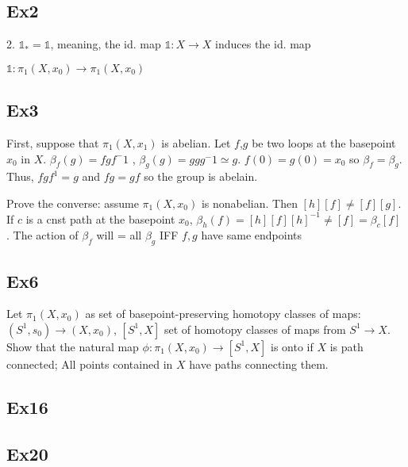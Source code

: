 \documentclass[11pt]{article}
\begin{document}
\subsection*{Ex2}

2. $\mathds{1}_* = \mathds{1}$, meaning, the id. map $\mathds{1} : X \rightarrow X$ induces the id. map

$\mathds{1} : \pi_1(X,x_0) \rightarrow \pi_1(X,x_0)$







\subsection*{Ex3}

First, suppose that $\pi_1(X,x_1)$ is abelian. Let $f$,$g$ be two loops at the basepoint $x_0$ in $X$. 
$\beta_f(g) = fgf^-1$ , $\beta_g(g) = ggg^-1 \simeq g$. $f(0) = g(0) = x_0$ so $\beta_f = \beta_g$. Thus, $fgf^1 = g$ and 
$fg = gf$ so the group is abelain. 

Prove the converse: assume $\pi_1(X,x_0)$ is nonabelian. Then $[h][f] \not= [f][g]$. If $c$ is a cnst path at the basepoint
$x_0$, $\beta_h(f) = [h][f][h]^{-1} \not= [f] = \beta_c[f]$ . The action of $\beta_f$ will = all $\beta_g$ IFF $f,g$ have
same endpoints

\subsection*{Ex6}

Let $\pi_1(X,x_0)$ as set of basepoint-preserving homotopy classes of maps: $(S^1,s_0) \rightarrow (X,x_0)$, $[S^1,X]$ set of homotopy
classes of maps from $S^1 \rightarrow X$. Show that the natural map $\phi : \pi_1(X,x_0) \rightarrow [S^1,X] $ is onto if $X$ is path
connected; All points contained in $X$ have paths connecting them. 




\subsection*{Ex16}

\subsection*{Ex20}
\end{document}
